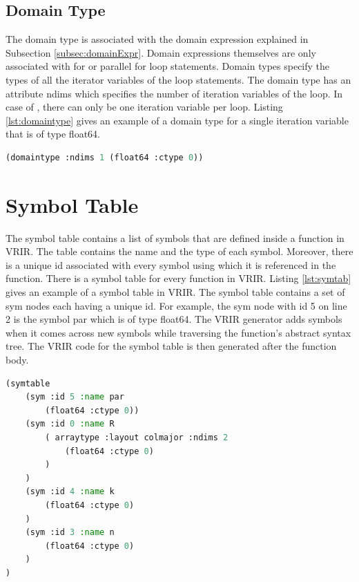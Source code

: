 \subsection{Domain Type}
The domain type is associated with the domain expression explained in Subsection \ref{subsec:domainExpr}. Domain expressions themselves are only associated with for or parallel for loop statements. Domain types specify the types of all the iterator variables of the loop statements. The domain type has an attribute ndims which specifies the number of iteration variables of the loop. In case of \matlab, there can only be one iteration variable per loop. Listing \ref{lst:domaintype} gives an example of a domain type for a single iteration variable that is of type \textsf{float64}. 
\begin{lstlisting}[float,language=lisp, label={lst:domaintype}, caption={Symbol table in VRIR}]
(domaintype :ndims 1 (float64 :ctype 0))
\end{lstlisting}

\section{Symbol Table}
The symbol table contains a list of symbols that are defined inside a function in VRIR. The table contains the name and the type of each symbol. Moreover, there is a unique id associated with every symbol using which it is referenced in the function. There is a symbol table for every function in VRIR. Listing \ref{lst:symtab} gives an example of a symbol table in VRIR. The symbol table contains a set of sym nodes each having a unique id. For example, the sym node with id 5 on line 2 is the symbol par which is of type float64. The VRIR generator adds symbols when it comes across new symbols while traversing the function's abstract syntax tree. The VRIR code for the symbol table is then generated after the function body.
\begin{lstlisting}[float,language=lisp, label={lst:symtab}, caption={Symbol table in VRIR}]
(symtable
	(sym :id 5 :name par 
		(float64 :ctype 0)) 
	(sym :id 0 :name R 
		( arraytype :layout colmajor :ndims 2
			(float64 :ctype 0)
		)
	) 
	(sym :id 4 :name k 
		(float64 :ctype 0)
	) 
	(sym :id 3 :name n 
		(float64 :ctype 0)
	) 
)
\end{lstlisting}
